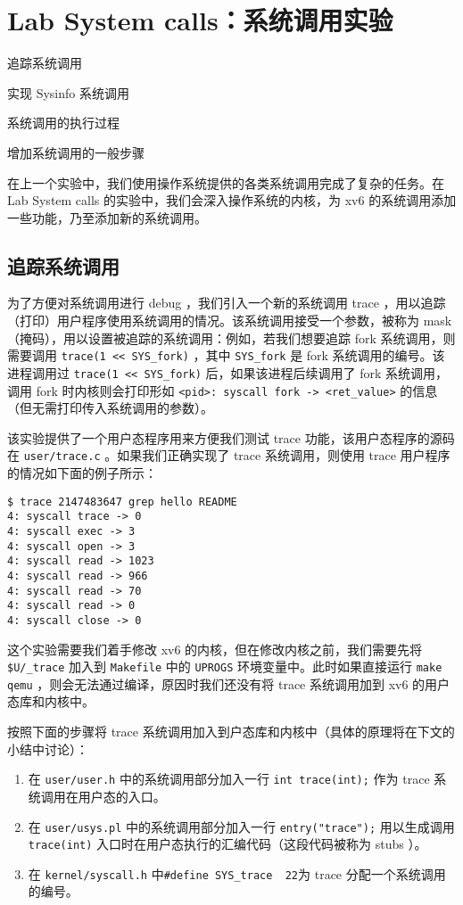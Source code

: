 \chapter{Lab System calls：系统调用实验}
\begin{introduction}
    \item 追踪系统调用
    \item 实现 Sysinfo 系统调用
    \item 系统调用的执行过程
    \item 增加系统调用的一般步骤
\end{introduction}

在上一个实验中，我们使用操作系统提供的各类系统调用完成了复杂的任务。在 Lab System calls 的实验中，我们会深入操作系统的内核，为 xv6 的系统调用添加一些功能，乃至添加新的系统调用。

\section{追踪系统调用}

为了方便对系统调用进行 debug ，我们引入一个新的系统调用 trace ，用以追踪（打印）用户程序使用系统调用的情况。该系统调用接受一个参数，被称为 mask （掩码），用以设置被追踪的系统调用：例如，若我们想要追踪 fork 系统调用，则需要调用 \lstinline{trace(1 << SYS_fork)} ，其中 \lstinline{SYS_fork} 是 fork 系统调用的编号。该进程调用过 \lstinline{trace(1 << SYS_fork)} 后，如果该进程后续调用了 fork 系统调用，调用 fork 时内核则会打印形如 \lstinline{<pid>: syscall fork -> <ret_value>} 的信息（但无需打印传入系统调用的参数）。

该实验提供了一个用户态程序用来方便我们测试 trace 功能，该用户态程序的源码在 \lstinline{user/trace.c} 。如果我们正确实现了 trace 系统调用，则使用 trace 用户程序的情况如下面的例子所示：

\begin{lstlisting}
$ trace 2147483647 grep hello README
4: syscall trace -> 0
4: syscall exec -> 3
4: syscall open -> 3
4: syscall read -> 1023
4: syscall read -> 966
4: syscall read -> 70
4: syscall read -> 0
4: syscall close -> 0
\end{lstlisting}

这个实验需要我们着手修改 xv6 的内核，但在修改内核之前，我们需要先将 \lstinline{$U/_trace} 加入到 \lstinline{Makefile} 中的 \lstinline{UPROGS} 环境变量中。此时如果直接运行 \lstinline{make qemu} ，则会无法通过编译，原因时我们还没有将 trace 系统调用加到 xv6 的用户态库和内核中。

按照下面的步骤将 trace 系统调用加入到户态库和内核中（具体的原理将在下文的小结中讨论）：
\begin{enumerate}
    \item 在 \lstinline{user/user.h} 中的系统调用部分加入一行 \lstinline{int trace(int);} 作为 trace 系统调用在用户态的入口。
    \item 在 \lstinline{user/usys.pl} 中的系统调用部分加入一行 \lstinline{entry("trace");} 用以生成调用 \lstinline{trace(int)} 入口时在用户态执行的汇编代码（这段代码被称为 stubs ）。
    \item 在 \lstinline{kernel/syscall.h} 中\lstinline{#define SYS_trace  22}为 trace 分配一个系统调用的编号。
\end{enumerate}

